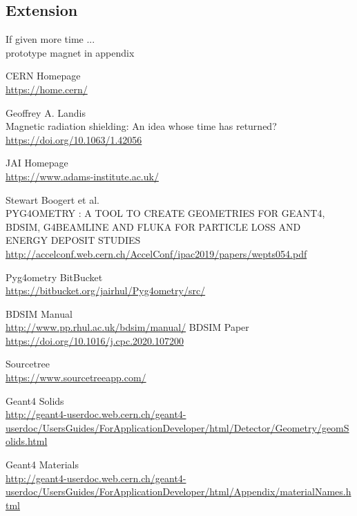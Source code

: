 \documentclass[12pt,a4paper]{article}
\begin{document}
\subsection{Extension}
If given more time ...\\
prototype magnet in appendix
\newpage
\newpage
\begin{thebibliography}{1}

	CERN Homepage\\
	\url{https://home.cern/}
	
	Geoffrey A. Landis\\
	Magnetic radiation shielding: An idea whose time has returned?\\
	\url{https://doi.org/10.1063/1.42056}
	
	JAI Homepage\\
	\url{https://www.adams-institute.ac.uk/}

	Stewart Boogert et al.\\
	PYG4OMETRY : A TOOL TO CREATE GEOMETRIES FOR GEANT4,\\
BDSIM, G4BEAMLINE AND FLUKA FOR PARTICLE LOSS AND\\
ENERGY DEPOSIT STUDIES\\
	\url{http://accelconf.web.cern.ch/AccelConf/ipac2019/papers/wepts054.pdf}

	
	Pyg4ometry BitBucket\\
	\url{https://bitbucket.org/jairhul/Pyg4ometry/src/}
	
	\bibitem{}
		BDSIM Manual\\
		\url{http://www.pp.rhul.ac.uk/bdsim/manual/}
	\bibitem{}
		BDSIM Paper\\
		\url{https://doi.org/10.1016/j.cpc.2020.107200}
		
		Sourcetree\\
		\url{https://www.sourcetreeapp.com/}
		
	\bibitem{}
	Geant4 Solids\\
	\url{http://geant4-userdoc.web.cern.ch/geant4-userdoc/UsersGuides/ForApplicationDeveloper/html/Detector/Geometry/geomSolids.html}
	
	Geant4 Materials\\
	\url{http://geant4-userdoc.web.cern.ch/geant4-userdoc/UsersGuides/ForApplicationDeveloper/html/Appendix/materialNames.html}
	

\end{thebibliography}
\end{document}
